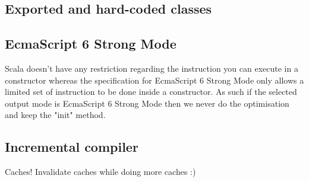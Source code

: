 \subsection{Exported and hard-coded classes}
\subsection{EcmaScript 6 Strong Mode}
Scala doesn't have any restriction regarding the instruction you can execute in a constructor whereas the specification for EcmaScript 6 Strong Mode only allows a limited set of instruction to be done inside a constructor. As such if the selected output mode is EcmaScript 6 Strong Mode then we never do the optimisation and keep the "init" method.
\subsection{Incremental compiler}
Caches! Invalidate caches while doing more caches :)

